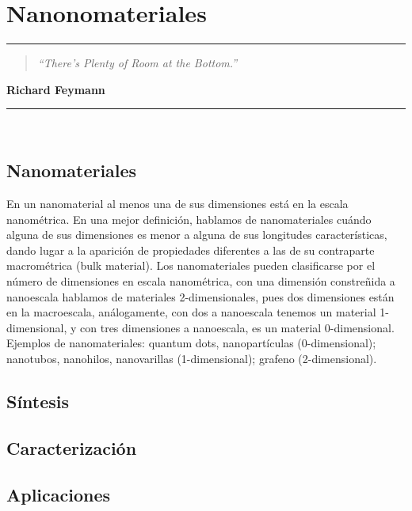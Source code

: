 \chapter{\label{cap:1} Nanonomateriales}

\noindent
\rule{\linewidth}{1 pt}
\begin{flushright}
\begin{quotation}
\small{
\textit{``There’s Plenty of Room at the Bottom.''}}
\end{quotation}
\bf{Richard Feymann}
\end{flushright}
\noindent
\rule{\linewidth}{1 pt}\\
\vspace{1cm}


\section{Nanomateriales}
En un nanomaterial al menos una de sus dimensiones está en la escala nanométrica. En una mejor definición, hablamos de nanomateriales cuándo alguna de sus dimensiones es menor a alguna de sus longitudes características, dando lugar a la aparición de propiedades diferentes a las de su contraparte macrométrica (bulk material). Los nanomateriales pueden clasificarse por el número de dimensiones en escala nanométrica, con una dimensión constreñida a nanoescala hablamos de materiales 2-dimensionales, pues dos dimensiones están en la macroescala, análogamente, con dos a nanoescala tenemos un material 1-dimensional, y con tres dimensiones a nanoescala, es un material 0-dimensional. Ejemplos de nanomateriales: quantum dots,  nanopartículas (0-dimensional); nanotubos, nanohilos, nanovarillas (1-dimensional); grafeno (2-dimensional).

\section{Síntesis}


\section{Caracterización}

\section{Aplicaciones}
